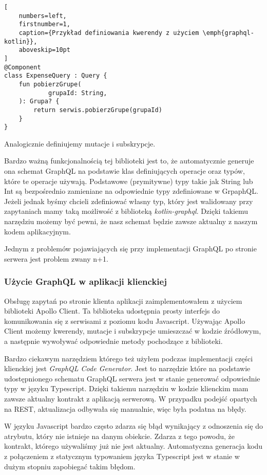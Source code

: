 \begin{addmargin}[6mm]{0mm}
\begin{lstlisting}[
    numbers=left,
    firstnumber=1,
    caption={Przykład definiowania kwerendy z użyciem \emph{graphql-kotlin}},
    aboveskip=10pt
]
@Component
class ExpenseQuery : Query {
    fun pobierzGrupe(
            grupaId: String,
    ): Grupa? {
        return serwis.pobierzGrupe(grupaId)
    }
}
\end{lstlisting}
\end{addmargin}
  
Analogicznie definiujemy mutacje i subskrypcje.

Bardzo ważną funkcjonalnością tej biblioteki jest to, że automatycznie generuje ona schemat GraphQL na podstawie klas definiujących operacje oraz typów, które te operacje używają. Podstawowe (prymitywne) typy takie jak String lub Int są bezpośrednio zamieniane na odpowiednie typy zdefiniowane w GrpaphQL. Jeżeli jednak byśmy chcieli zdefiniować własny typ, który jest walidowany przy zapytaniach mamy taką możliwość z biblioteką \emph{kotlin-graphql}. 
Dzięki takiemu narzędziu możemy być pewni, że nasz schemat będzie zawsze aktualny z naszym kodem aplikacyjnym.

Jednym z problemów pojawiających się przy implementacji GraphQL po stronie serwera jest problem zwany n+1.

\subsubsection{Użycie GraphQL w aplikacji klienckiej}
Obsługę zapytań po stronie klienta aplikacji zaimplementowałem z użyciem biblioteki Apollo Client. Ta biblioteka udostępnia prosty interfejs do komunikowania się z serwisami z poziomu kodu Javascript. Używając Apollo Client możemy kwerendy, mutacje i subskrypcje umieszczać w kodzie źródłowym, a następnie wywoływać odpowiednie metody pochodzące z biblioteki. 

Bardzo ciekawym narzędziem którego też użyłem podczas implementacji części klienckiej jest \emph{GraphQL Code Generator}. Jest to narzędzie które na podstawie udostępnionego schematu GraphQL serwera jest w stanie generować odpowiednie typy w języku Typescript. Dzięki takiemu narzędziu w kodzie klienckim mam zawsze aktualny kontrakt z aplikacją serwerową. W przypadku podejść opartych na REST, aktualizacja odbywała się manualnie, więc była podatna na błędy.

W języku Javascript bardzo często zdarza się błąd wynikający z odnoszenia się do atrybutu, który nie istnieje na danym obiekcie. Zdarza z tego powodu, że kontrakt, którego używaliśmy już nie jest aktualny. Automatyczna generacja kodu z połączeniem z statycznym typowaniem języka Typescript jest w stanie w dużym stopniu zapobiegać takim błędom.

